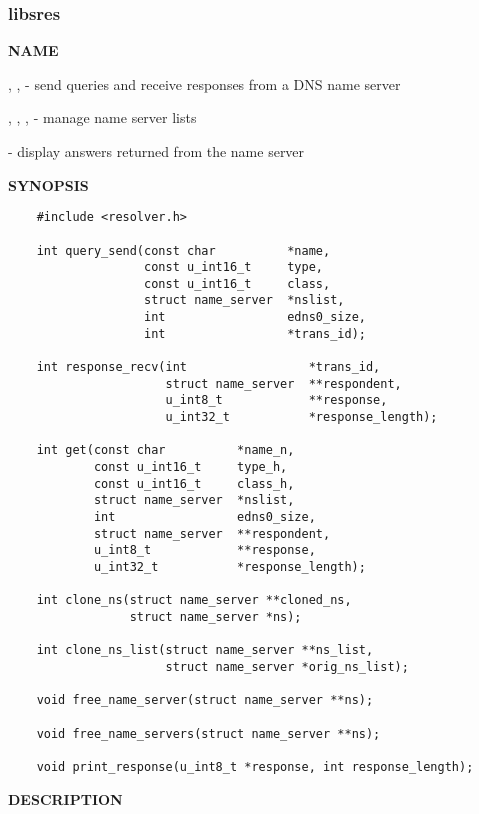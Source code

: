 \clearpage

\subsubsection{libsres}

{\bf NAME}

, ,  - 
send queries and receive responses from a DNS name server

, , ,
 - manage name server lists

 - display answers returned from the name server

{\bf SYNOPSIS}

\begin{verbatim}
    #include <resolver.h>

    int query_send(const char          *name,
                   const u_int16_t     type,
                   const u_int16_t     class,
                   struct name_server  *nslist,
                   int                 edns0_size,
                   int                 *trans_id);
  
    int response_recv(int                 *trans_id,
                      struct name_server  **respondent,
                      u_int8_t            **response,
                      u_int32_t           *response_length);

    int get(const char          *name_n,
            const u_int16_t     type_h,
            const u_int16_t     class_h,
            struct name_server  *nslist,
            int                 edns0_size,
            struct name_server  **respondent,
            u_int8_t            **response,
            u_int32_t           *response_length);

    int clone_ns(struct name_server **cloned_ns,
                 struct name_server *ns);

    int clone_ns_list(struct name_server **ns_list,
                      struct name_server *orig_ns_list);

    void free_name_server(struct name_server **ns);

    void free_name_servers(struct name_server **ns);

    void print_response(u_int8_t *response, int response_length);
\end{verbatim}

{\bf DESCRIPTION}

